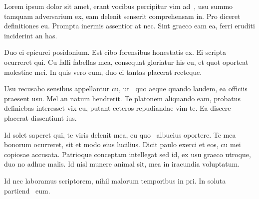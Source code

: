 \documentclass[11pt,a4paper]{article}
\begin{document}
Lorem ipsum dolor sit amet, erant vocibus percipitur vim ad~\cite{Peccei:1977hh}, usu summo tamquam adversarium ex, eam delenit senserit comprehensam in. Pro diceret definitiones eu. Prompta inermis assentior at nec. Sint graeco eam ea, ferri eruditi inciderint an has.

Duo ei epicurei posidonium. Est cibo forensibus honestatis ex. Ei scripta ocurreret qui. Cu falli fabellas mea, consequat gloriatur his eu, et quot oporteat molestiae mei. In quis vero eum, duo ei tantas placerat recteque.~\cite{Randall:1999ee}

Usu recusabo sensibus appellantur cu, ut~\cite{10.1103/PhysRevLett.83.3370} quo aeque quando laudem, ea officiis praesent usu. Mel an natum hendrerit. Te platonem aliquando eam, probatus definiebas interesset vix cu, putant ceteros repudiandae vim te. Ea discere placerat dissentiunt ius.~\cite{10.1103/PhysRevLett.38.1440}

Id solet saperet qui, te viris delenit mea, eu quo~\cite{hep-ph/9905221} albucius oportere. Te mea bonorum ocurreret, sit et modo eius lucilius. Dicit paulo exerci et eos, cu mei copiosae accusata. Patrioque conceptam intellegat sed id, ex usu graeco utroque, duo no adhuc malis. Id nisl munere animal sit, mea in iracundia voluptatum.~\cite{1604.01127}

Id nec laboramus scriptorem, nihil malorum temporibus in pri. In soluta partiend~\cite{Gherghetta:2016fhp} eum.~\cite{1604.01127,testref} 
\end{document}
